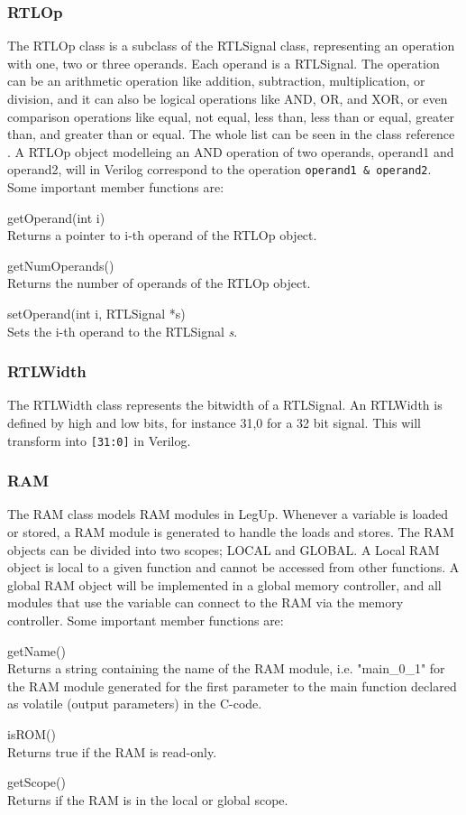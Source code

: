 \subsubsection{RTLOp}
The RTLOp class is a subclass of the RTLSignal class, representing an operation with one, two or three operands. Each operand is a RTLSignal. The operation can be an arithmetic operation like addition, subtraction, multiplication, or division, and it can also be logical operations like AND, OR, and XOR, or even comparison operations like equal, not equal, less than, less than or equal, greater than, and greater than or equal. The whole list can be seen in the class reference \cite{rtlopclassref}. A RTLOp object modelleing an AND operation of two operands, operand1 and operand2, will in Verilog correspond to the operation \verb!operand1 & operand2!. Some important member functions are:
\begin{compactdesc}
    \item[getOperand(int i)] \hfill \\
    Returns a pointer to i-th operand of the RTLOp object.
    \item[getNumOperands()] \hfill \\
    Returns the number of operands of the RTLOp object.
    \item[setOperand(int i, RTLSignal *s)] \hfill \\
    Sets the i-th operand to the RTLSignal \textit{s}.
\end{compactdesc}
\subsubsection{RTLWidth}
The RTLWidth class represents the bitwidth of a RTLSignal. An RTLWidth is defined by high and low bits, for instance 31,0 for a 32 bit signal. This will transform into \verb![31:0]! in Verilog.
\subsubsection{RAM}
The RAM class models RAM modules in LegUp. Whenever a variable is loaded or stored, a RAM module is generated to handle the loads and stores. The RAM objects can be divided into two scopes; LOCAL and GLOBAL. A Local RAM object is local to a given function and cannot be accessed from other functions. A global RAM object will be implemented in a global memory controller, and all modules that use the variable can connect to the RAM via the memory controller. Some important member functions are:
\begin{compactdesc}
    \item[getName()] \hfill \\
    Returns a string containing the name of the RAM module, i.e. "main\_0\_1" for the RAM module generated for the first parameter to the main function declared as volatile (output parameters) in the C-code.
    \item[isROM()] \hfill \\
    Returns true if the RAM is read-only.
    \item[getScope()] \hfill \\
    Returns if the RAM is in the local or global scope.
\end{compactdesc}


